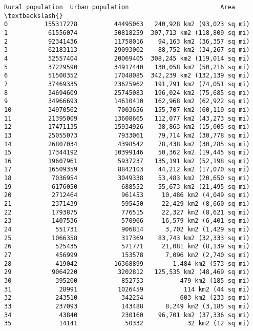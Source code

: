 \documentclass[11pt]{article}
\begin{document}
\begin{tcolorbox}[breakable, boxrule=.5pt, size=fbox, pad at break*=1mm, opacityfill=0]
\begin{Verbatim}[commandchars=\\\{\}]
    Rural population  Urban population                         Area  \textbackslash{}
0          155317278          44495063   240,928 km2 (93,023 sq mi)
1           61556074          50818259  307,713 km2 (118,809 sq mi)
2           92341436          11758016    94,163 km2 (36,357 sq mi)
3           62183113          29093002    88,752 km2 (34,267 sq mi)
4           52557404          20069405  308,245 km2 (119,014 sq mi)
5           37229590          34917440   130,058 km2 (50,216 sq mi)
6           51500352          17048085  342,239 km2 (132,139 sq mi)
7           37469335          23625962   191,791 km2 (74,051 sq mi)
8           34694609          25745083   196,024 km2 (75,685 sq mi)
9           34966693          14610410   162,968 km2 (62,922 sq mi)
10          34970562           7003656   155,707 km2 (60,119 sq mi)
11          21395009          13608665   112,077 km2 (43,273 sq mi)
12          17471135          15934926    38,863 km2 (15,005 sq mi)
13          25055073           7933061    79,714 km2 (30,778 sq mi)
14          26807034           4398542    78,438 km2 (30,285 sq mi)
15          17344192          10399146    50,362 km2 (19,445 sq mi)
16          19607961           5937237   135,191 km2 (52,198 sq mi)
17          16509359           8842103    44,212 km2 (17,070 sq mi)
18           7036954           3049338    53,483 km2 (20,650 sq mi)
19           6176050            688552    55,673 km2 (21,495 sq mi)
20           2712464            961453     10,486 km2 (4,049 sq mi)
21           2371439            595450     22,429 km2 (8,660 sq mi)
22           1793875            776515     22,327 km2 (8,621 sq mi)
23           1407536            570966     16,579 km2 (6,401 sq mi)
24            551731            906814      3,702 km2 (1,429 sq mi)
25           1066358            317369    83,743 km2 (32,333 sq mi)
26            525435            571771     21,081 km2 (8,139 sq mi)
27            456999            153578      7,096 km2 (2,740 sq mi)
28            419042          16368899        1,484 km2 (573 sq mi)
29           9064220           3202812   125,535 km2 (48,469 sq mi)
30            395200            852753          479 km2 (185 sq mi)
31             28991           1026459           114 km2 (44 sq mi)
32            243510            342254          603 km2 (233 sq mi)
33            237093            143488      8,249 km2 (3,185 sq mi)
34             43840            230160    96,701 km2 (37,336 sq mi)
35             14141             50332            32 km2 (12 sq mi)


\end{Verbatim}
\end{tcolorbox}
\end{document}
